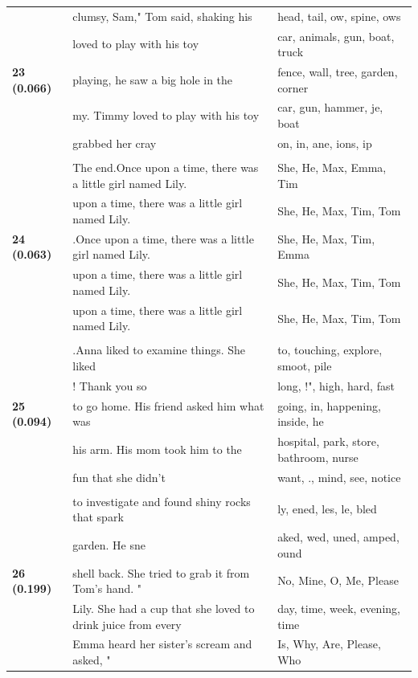 \documentclass{article}
\theoremstyle{plain}
\theoremstyle{definition}
\theoremstyle{remark}
\begin{document}
\begin{longtable}{|p{}|p{}|p{}|}
\multirow{5}{*}{\textbf{23 (0.066)}} & clumsy, Sam," Tom said, shaking his & head,  tail, ow,  spine, ows \\
& loved to play with his toy & car,  animals,  gun,  boat,  truck \\
& playing, he saw a big hole in the & fence,  wall,  tree,  garden,  corner \\
& my. Timmy loved to play with his toy & car,  gun,  hammer,  je,  boat \\
& grabbed her cray & on, in, ane, ions, ip \\
& & \\
\multirow{5}{*}{\textbf{24 (0.063)}} & The end.Once upon a time, there was a little girl named Lily. & She,  He,  Max,  Emma,  Tim \\
& upon a time, there was a little girl named Lily. & She,  He,  Max,  Tim,  Tom \\
& .Once upon a time, there was a little girl named Lily. & She,  He,  Max,  Tim,  Emma \\
& upon a time, there was a little girl named Lily. & She,  He,  Max,  Tim,  Tom \\
& upon a time, there was a little girl named Lily. & She,  He,  Max,  Tim,  Tom \\
& & \\
\multirow{5}{*}{\textbf{25 (0.094)}} & .Anna liked to examine things. She liked & to,  touching,  explore,  smoot,  pile \\
& ! Thank you so & long, !",  high,  hard,  fast \\
& to go home. His friend asked him what was & going,  in,  happening,  inside,  he \\
& his arm. His mom took him to the & hospital,  park,  store,  bathroom,  nurse \\
& fun that she didn't & want, .,  mind,  see,  notice \\
& & \\
\multirow{5}{*}{\textbf{26 (0.199)}} & to investigate and found shiny rocks that spark & ly, ened, les, le, bled \\
& garden. He sne & aked, wed, uned, amped, ound \\
& shell back. She tried to grab it from Tom's hand.  " & No, Mine, O, Me, Please \\
& Lily. She had a cup that she loved to drink juice from every & day,  time,  week,  evening, time \\
& Emma heard her sister's scream and asked, " & Is, Why, Are, Please, Who \\

\end{longtable}
\end{document}

